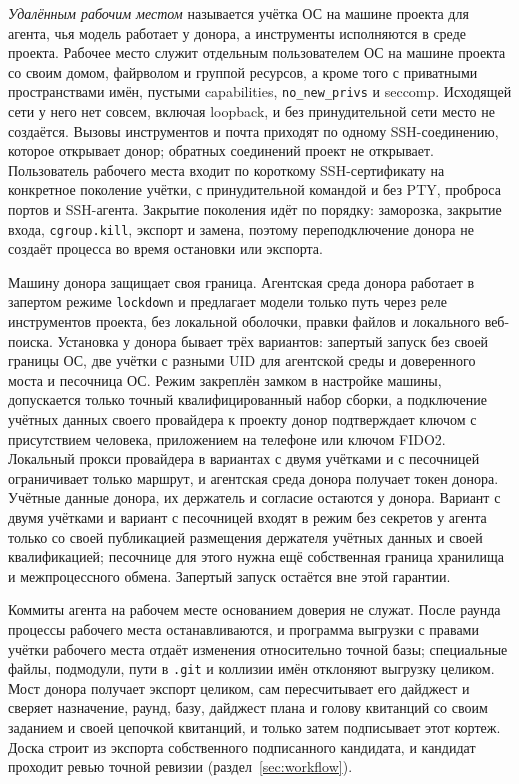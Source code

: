 \documentclass[10pt,a4paper]{article}
\begin{document}
\emph{Удалённым рабочим местом} называется учётка ОС на машине проекта для агента, чья модель работает у донора, а инструменты исполняются в среде проекта. Рабочее место служит отдельным пользователем ОС на машине проекта со своим домом, файрволом и группой ресурсов, а кроме того с приватными пространствами имён, пустыми capabilities, \texttt{no\_new\_privs} и seccomp. Исходящей сети у него нет совсем, включая loopback, и без принудительной сети место не создаётся. Вызовы инструментов и почта приходят по одному SSH-соединению, которое открывает донор; обратных соединений проект не открывает. Пользователь рабочего места входит по короткому SSH-сертификату на конкретное поколение учётки, с принудительной командой и без PTY, проброса портов и SSH-агента. Закрытие поколения идёт по порядку: заморозка, закрытие входа, \texttt{cgroup.kill}, экспорт и замена, поэтому переподключение донора не создаёт процесса во время остановки или экспорта.

Машину донора защищает своя граница. Агентская среда донора работает в запертом режиме \texttt{lockdown} и предлагает модели только путь через реле инструментов проекта, без локальной оболочки, правки файлов и локального веб-поиска. Установка у донора бывает трёх вариантов: запертый запуск без своей границы ОС, две учётки с разными UID для агентской среды и доверенного моста и песочница ОС. Режим закреплён замком в настройке машины, допускается только точный квалифицированный набор сборки, а подключение учётных данных своего провайдера к проекту донор подтверждает ключом с присутствием человека, приложением на телефоне или ключом FIDO2. Локальный прокси провайдера в вариантах с двумя учётками и с песочницей ограничивает только маршрут, и агентская среда донора получает токен донора. Учётные данные донора, их держатель и согласие остаются у донора. Вариант с двумя учётками и вариант с песочницей входят в режим без секретов у агента только со своей публикацией размещения держателя учётных данных и своей квалификацией; песочнице для этого нужна ещё собственная граница хранилища и межпроцессного обмена. Запертый запуск остаётся вне этой гарантии.

Коммиты агента на рабочем месте основанием доверия не служат. После раунда процессы рабочего места останавливаются, и программа выгрузки с правами учётки рабочего места отдаёт изменения относительно точной базы; специальные файлы, подмодули, пути в \texttt{.git} и коллизии имён отклоняют выгрузку целиком. Мост донора получает экспорт целиком, сам пересчитывает его дайджест и сверяет назначение, раунд, базу, дайджест плана и голову квитанций со своим заданием и своей цепочкой квитанций, и только затем подписывает этот кортеж. Доска строит из экспорта собственного подписанного кандидата, и кандидат проходит ревью точной ревизии (раздел~\ref{sec:workflow}).
\end{document}
